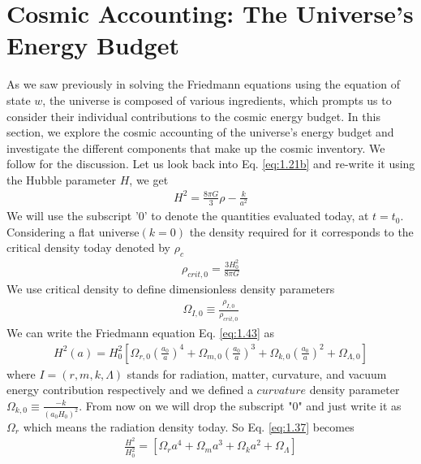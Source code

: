 
\section{Cosmic Accounting: The Universe's Energy Budget} \label{section 1.4}
\hspace{0.5cm}As we saw previously in solving the Friedmann equations using the equation of state $w$, the universe is composed of various ingredients, which prompts us to consider their individual contributions to the cosmic energy budget. 
In this section, we explore the cosmic accounting of the universe's energy budget and investigate the different components that make up the cosmic inventory. We follow \cite{Baumann_2022} for the discussion.
Let us look back into Eq.  \eqref{eq:1.21b} and re-write it using the Hubble parameter $H$, we get
\begin{align}
    H^2 = \frac{8 \pi G}{3} \rho - \frac{k}{a^2} \label{eq:1.43}
\end{align}
We will use the subscript '0' to denote the quantities evaluated today, at $t= t_0$. Considering a flat universe$(k = 0)$ the density required for it corresponds to the critical density today denoted by $\rho_c$
\begin{align}
    \rho_{crit,0} =\frac{3H_{0}^{2}}{8\pi G} \label{eq:1.35}
\end{align}
We use critical density to define dimensionless density parameters
\begin{align}
    \Omega_{I,0} \equiv \frac{\rho_{I,0}}{\rho_{crit,0}}\label{eq:1.36}
\end{align}
We can write the Friedmann equation Eq. \eqref{eq:1.43} as
\begin{align}
    H^2(a) = H_{0}^2 \left[\Omega_{r,0}\left(\frac{a_0}{a}\right)^4 + \Omega_{m,0}\left(\frac{a_0}{a}\right)^3 + \Omega_{k,0}\left(\frac{a_0}{a}\right)^2 +\Omega_{\Lambda,0}\right] \label{eq:1.37}
\end{align}
where $I = (r,m,k,\Lambda)$ stands for radiation, matter, curvature, and vacuum energy contribution respectively and we defined a $curvature$ density parameter $ \Omega_{k,0} \equiv \frac{-k}{(a_0H_0)^2}$. From now on we will drop the subscript "0" and just write it as  $\Omega_{r}$ which means the radiation density today. So Eq. \eqref{eq:1.37} becomes
\begin{align}
     \frac{H^2}{H_{0}^2} = [\Omega_{r}a^4 + \Omega_{m}a^3 + \Omega_{k}a^2 +\Omega_{\Lambda}] \label{eq:1.38}
\end{align}
